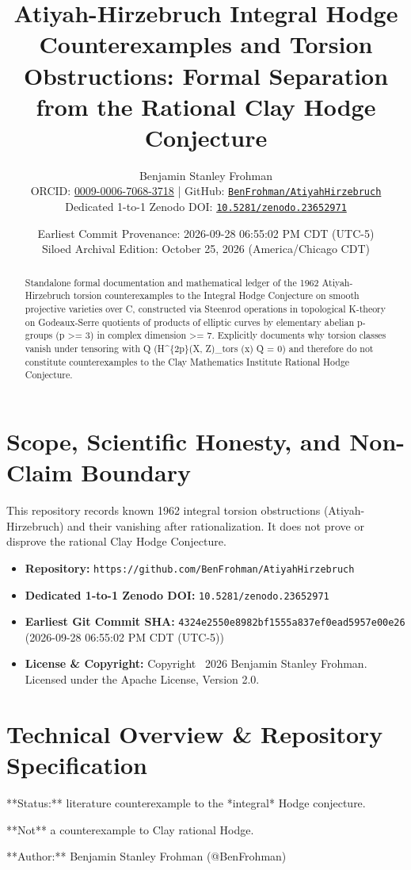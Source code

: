 \documentclass[11pt,a4paper]{article}
\title{\textbf{Atiyah-Hirzebruch Integral Hodge Counterexamples and Torsion Obstructions: Formal Separation from the Rational Clay Hodge Conjecture}}
\author{Benjamin Stanley Frohman\\
\small ORCID: \href{https://orcid.org/0009-0006-7068-3718}{0009-0006-7068-3718} \quad|\quad
GitHub: \href{https://github.com/BenFrohman/AtiyahHirzebruch}{\texttt{BenFrohman/AtiyahHirzebruch}}\\
\small Dedicated 1-to-1 Zenodo DOI: \href{https://doi.org/10.5281/zenodo.23652971}{\texttt{10.5281/zenodo.23652971}}}
\date{Earliest Commit Provenance: 2026-09-28 06:55:02 PM CDT (UTC-5)\\
Siloed Archival Edition: October 25, 2026 (America/Chicago CDT)}
\begin{document}
\maketitle

\begin{abstract}
Standalone formal documentation and mathematical ledger of the 1962 Atiyah-Hirzebruch torsion counterexamples to the Integral Hodge Conjecture on smooth projective varieties over C, constructed via Steenrod operations in topological K-theory on Godeaux-Serre quotients of products of elliptic curves by elementary abelian p-groups (p >= 3) in complex dimension >= 7. Explicitly documents why torsion classes vanish under tensoring with Q (H\textasciicircum{}\{2p\}(X, Z)\_tors (x) Q = 0) and therefore do not constitute counterexamples to the Clay Mathematics Institute Rational Hodge Conjecture.
\end{abstract}

\section{Scope, Scientific Honesty, and Non-Claim Boundary}
This repository records known 1962 integral torsion obstructions (Atiyah-Hirzebruch) and their vanishing after rationalization. It does not prove or disprove the rational Clay Hodge Conjecture.

\begin{itemize}
  \item \textbf{Repository:} \texttt{https://github.com/BenFrohman/AtiyahHirzebruch}
  \item \textbf{Dedicated 1-to-1 Zenodo DOI:} \texttt{10.5281/zenodo.23652971}
  \item \textbf{Earliest Git Commit SHA:} \texttt{4324e2550e8982bf1555a837ef0ead5957e00e26} (2026-09-28 06:55:02 PM CDT (UTC-5))
  \item \textbf{License \& Copyright:} Copyright \textcopyright\ 2026 Benjamin Stanley Frohman. Licensed under the Apache License, Version 2.0.
\end{itemize}

\section{Technical Overview \& Repository Specification}
**Status:** literature counterexample to the *integral* Hodge conjecture.

**Not** a counterexample to Clay rational Hodge.

**Author:** Benjamin Stanley Frohman (@BenFrohman)
\end{document}
